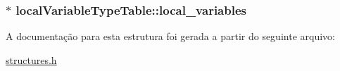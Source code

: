 \subsubsection[{\texorpdfstring{local\+\_\+variables}{local_variables}}]{$\ast$ local\+Variable\+Type\+Table\+::local\+\_\+variables}\hypertarget{structlocalVariableTypeTable_acb5bcd42df545b2aeb7517e01e1b5ed0}{}\label{structlocalVariableTypeTable_acb5bcd42df545b2aeb7517e01e1b5ed0}


A documentação para esta estrutura foi gerada a partir do seguinte arquivo\+:\begin{DoxyCompactItemize}
\item 
\hyperlink{structures_8h}{structures.\+h}\end{DoxyCompactItemize}
